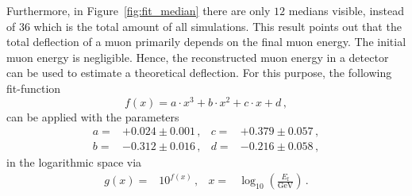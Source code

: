 \documentclass[pdflatex, sn-mathphys]{sn-jnl}%
\theoremstyle{thmstyleone}%
\theoremstyle{thmstyletwo}%
\theoremstyle{thmstylethree}%
\begin{document}
Furthermore, in Figure~\ref{fig:fit_median} there are only $12$ medians visible, 
instead of $36$ which is the total amount of all simulations. This result points 
out that the total deflection of a muon 
primarily depends on the final muon energy.
The initial muon energy is negligible. 
Hence, the reconstructed muon 
energy in a detector can be used to estimate a theoretical deflection. For this 
purpose, the following fit-function 
\begin{equation}
     f(x) = a \cdot x^3 + b \cdot x^2 + c \cdot x + d \,,
    \label{eqn:fit_median}
\end{equation}
can be applied with the parameters 
\begin{align}
    a =& +0.024 \pm 0.001\,,  & c =& +0.379 \pm 0.057\,,\\
    b =& -0.312 \pm 0.016\,,  & d =& -0.216 \pm 0.058\,,
\end{align}
in the logarithmic space via 
\begin{align}
    g(x) =& 10^{f(x)}\,, & x =& \log_{10}\left(\frac{E_{\text{f}}}{\si{\giga\electronvolt}}\right)\,.
\end{align}
\end{document}
